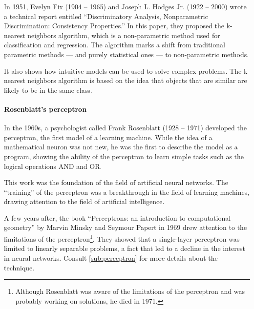 In 1951, Evelyn Fix (1904 -- 1965) and Joseph L. Hodges Jr. (1922 -- 2000) wrote a
technical report entitled ``Discriminatory Analysis, Nonparametric Discrimination:
Consistency Properties.''  In this paper, they proposed the k-nearest neighbors algorithm,
which is a non-parametric method used for classification and regression.  The algorithm
marks a shift from traditional parametric methods --- and purely statistical ones ---
to non-parametric methods.

It also shows how intuitive models can be used to solve complex problems.  The k-nearest
neighbors algorithm is based on the idea that objects that are similar are likely to be in
the same class.


\paragraph{Rosenblatt's perceptron}

In the 1960s, a psychologist called Frank Rosenblatt (1928 -- 1971) developed the perceptron, the first model of
a learning machine.  While the idea of a mathematical neuron was not new, he was the first
to describe the model as a program, showing the ability of the perceptron to learn simple
tasks such as the logical operations AND and OR.

This work was the foundation of the field of artificial neural networks.  The ``training''
of the perceptron was a breakthrough in the field of learning machines, drawing attention
to the field of artificial intelligence.


A few years after, the book ``Perceptrons: an introduction to computational geometry'' by
Marvin Minsky and Seymour Papert in 1969 drew attention to the limitations of the
perceptron\footnote{Although Rosenblatt was aware of the limitations of the perceptron
and was probably working on solutions, he died in 1971.}. They showed that a single-layer
perceptron was limited to linearly separable problems, a fact that led to a decline in the
interest in neural networks.
Consult \cref{sub:perceptron} for more details about the technique.


